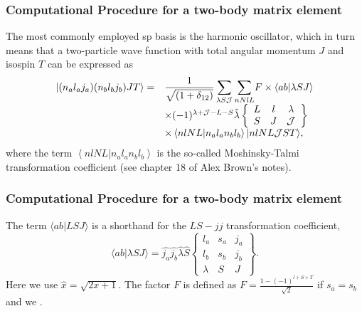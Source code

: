 \documentclass[compress]{beamer}
\newcommand*{\ket}[1]{|#1\rangle}
\begin{document}
\frame
{
\frametitle{Computational Procedure for a two-body matrix element}
\begin{small}
{\scriptsize
The most commonly employed sp basis is the harmonic oscillator, which
in turn means that
a two-particle wave function with total angular momentum $J$
and isospin $T$
can be expressed as 
\[
\begin{array}{ll}
\ket{(n_{a}l_{a}j_{a})(n_{b}l_{b}j_{b})JT}=&
{\displaystyle
\frac{1}{\sqrt{(1+\delta_{12})}}
\sum_{\lambda S{\cal J}}\sum_{nNlL}}
F\times \langle ab|\lambda SJ \rangle\\
&\times (-1)^{\lambda +{\cal J}-L-S}\hat{\lambda}
\left\{\begin{array}{ccc}L&l&\lambda\\S&J&{\cal J}
\end{array}\right\}\\
&\times \left\langle nlNL| n_al_an_bl_b\right\rangle
\ket{nlNL{\cal J}ST},\end{array}\label{eq:hoho}
\]
where the term
$\left\langle nlNL| n_al_an_bl_b\right\rangle$
is the so-called Moshinsky-Talmi transformation coefficient (see chapter 18 of Alex Brown's notes).
}
\end{small}
}


\frame
{
\frametitle{Computational Procedure for a two-body matrix element}
\begin{small}
{\scriptsize
The term $\langle ab|LSJ \rangle $ is a shorthand
for the $LS-jj$ transformation coefficient,
\[
     \langle ab|\lambda SJ \rangle = \hat{j_{a}}\hat{j_{b}}
     \hat{\lambda}\hat{S}
     \left\{
    \begin{array}{ccc}
       l_{a}&s_a&j_{a}\\
       l_{b}&s_b&j_{b}\\
       \lambda    &S          &J
    \end{array}
    \right\}.\label{eq:lstrans}
\]
Here
we use $\hat{x} = \sqrt{2x +1}$.
The factor $F$ is defined as $F=\frac{1-(-1)^{l+S+T}}{\sqrt{2}}$ if
$s_a = s_b$ and we .
}
\end{small}
}
\end{document}
